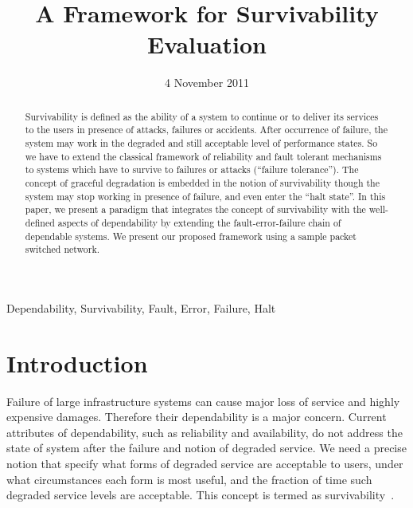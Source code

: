 \documentclass[onecolumn,conference]{IEEEtran}
\begin{document}
    \title{A Framework for Survivability Evaluation}
    \date{4 November 2011}

    \author{
    \and
    }

    \maketitle

    \begin{abstract}
        Survivability is defined as the ability of a system to continue or to deliver its services to the users in presence of attacks, failures or accidents. After occurrence of failure, the system may work in the degraded and still acceptable level of performance states. So we have to extend the classical framework of reliability and fault tolerant mechanisms to systems which have to survive to failures or attacks (``failure tolerance''). The concept of graceful degradation is embedded in the notion of survivability though the system may stop working in presence of failure, and even enter the ``halt state''. In this paper, we present a paradigm that integrates the concept of survivability with the well-defined aspects of dependability by extending the fault-error-failure chain of dependable systems. We present our proposed framework using a sample packet switched network.
    \end{abstract}

    \begin{IEEEkeywords}
        Dependability, Survivability, Fault, Error, Failure, Halt
    \end{IEEEkeywords}

    \section{Introduction} \label{sec:intro}
    Failure of large infrastructure systems can cause major loss of service and highly expensive damages. Therefore their dependability is a major concern. Current attributes of dependability, such as reliability and availability, do not address the state of system after the failure and notion of degraded service. We need a precise notion that specify what forms of degraded service are acceptable to users, under what circumstances each form is most useful, and the fraction of time such degraded service levels are acceptable. This concept is termed as survivability~\cite{b10}.
\end{document}
